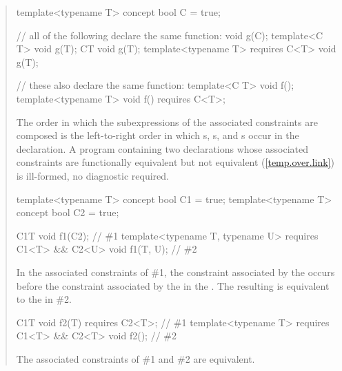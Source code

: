\begin{quote}
\enterexample
\begin{codeblock}
template<typename T> concept bool C = true;

// all of the following declare the same function:
void g(C);
template<C T> void g(T);
C{T} void g(T);
template<typename T> requires C<T> void g(T);

// these also declare the same function:
template<C T> void f();
template<typename T> void f() requires C<T>;
\end{codeblock}
\exitexample

\pnum
The order in which the subexpressions of the associated constraints
are composed is the left-to-right order in which 
s,
s, and
s occur in the declaration.
% 
\enternote
A program containing two declarations whose associated constraints are 
functionally equivalent but not equivalent (\ref{temp.over.link}) is 
ill-formed, no diagnostic required.
\exitnote
% 
\enterexample
\begin{codeblock}
template<typename T> concept bool C1 = true;
template<typename T> concept bool C2 = true;

C1{T} void f1(C2);                                                      // \#1
template<typename T, typename U> requires C1<T> && C2<U> void f1(T, U); // \#2
\end{codeblock}
% 
In the associated constraints of \#1, the constraint associated by the 
  occurs before the 
constraint associated by the  in the
 .
% 
The resulting  is equivalent to the 
 in \#2.
% 
\begin{codeblock}
C1{T} void f2(T) requires C2<T>;                        // \#1
template<typename T> requires C1<T> && C2<T> void f2(); // \#2
\end{codeblock}
The associated constraints of \#1 and \#2 are equivalent.


\end{quote}
